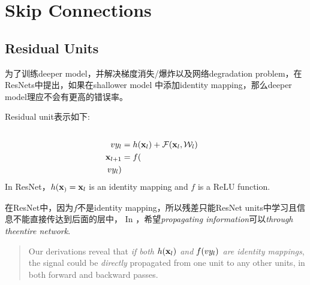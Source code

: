 \chapter{Skip Connections}

\section{Residual Units}
为了训练deeper model，并解决梯度消失/爆炸以及网络degradation problem，在ResNets\cite{He2016resnet}中提出，如果在shallower model
中添加identity mapping，那么deeper model理应不会有更高的错误率。
\par
Residual unit表示如下:
\begin{equation}
    \begin{split}
        \\vy_l &= h(\mathbf{x}_l) + \mathcal{F}(\mathbf{x}_l, \mathcal{W}_l) \\
        \mathbf{x}_{l+1} &= f(\\vy_l)
    \end{split}
\end{equation}
In ResNet，$h(\mathbf{x}_) = \mathbf{x}_l$ is an identity mapping and $f$ is a ReLU function.
\par
在ResNet中，因为$f$不是identity mapping，所以残差只能ResNet units中学习且信息不能直接传达到后面的层中，
In \cite{He2016identity}，希望\textit{propagating information}可以\textit{through theentire network}.
\begin{quotation}
    Our derivations reveal that \textit{if both $h(\mathbf{x}_l)$ and
$f(\\vy_l)$ are identity mappings}, the signal could be \textit{directly}
propagated from one unit to any other units, in both forward and backward passes.\cite{He2016identity}
\end{quotation}

